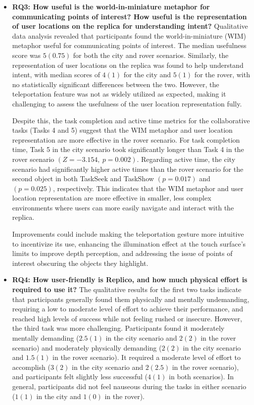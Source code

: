 \begin{itemize}
            \item \textbf{RQ3: How useful is the world-in-miniature metaphor for communicating points of interest? How useful is the representation of user locations on the replica for understanding intent?} Qualitative data analysis revealed that participants found the world-in-miniature (WIM) metaphor useful for communicating points of interest. The median usefulness score was $5 (0.75)$ for both the city and rover scenarios. Similarly, the representation of user locations on the replica was found to help understand intent, with median scores of $4 (1)$ for the city and $5 (1)$ for the rover, with no statistically significant differences between the two. However, the teleportation feature was not as widely utilized as expected, making it challenging to assess the usefulness of the user location representation fully. 
                       
            Despite this, the task completion and active time metrics for the collaborative tasks (Tasks 4 and 5) suggest that the WIM metaphor and user location representation are more effective in the rover scenario. For task completion time, Task 5 in the city scenario took significantly longer than Task 4 in the rover scenario $\left(Z = -3.154,\ p = 0.002\right)$. Regarding active time, the city scenario had significantly higher active times than the rover scenario for the second object in both TaskSeek and TaskShow $\left(p = 0.017\right)$ and $\left(p = 0.025\right)$, respectively. This indicates that the WIM metaphor and user location representation are more effective in smaller, less complex environments where users can more easily navigate and interact with the replica.

            Improvements could include making the teleportation gesture more intuitive to incentivize its use, enhancing the illumination effect at the touch surface's limits to improve depth perception, and addressing the issue of points of interest obscuring the objects they highlight.

            \item \textbf{RQ4: How user-friendly is Replico, and how much physical effort is required to use it?} The qualitative results for the first two tasks indicate that participants generally found them physically and mentally undemanding, requiring a low to moderate level of effort to achieve their performance, and reached high levels of success while not feeling rushed or insecure. However, the third task was more challenging. Participants found it moderately mentally demanding ($2.5(1)$ in the city scenario and $2(2)$ in the rover scenario) and moderately physically demanding ($2(2)$ in the city scenario and $1.5(1)$ in the rover scenario). It required a moderate level of effort to accomplish ($3(2)$ in the city scenario and $2(2.5)$ in the rover scenario), and participants felt slightly less successful ($4(1)$ in both scenarios). In general, participants did not feel nauseous during the tasks in either scenario ($1(1)$ in the city and $1(0)$ in the rover).


\end{itemize}
